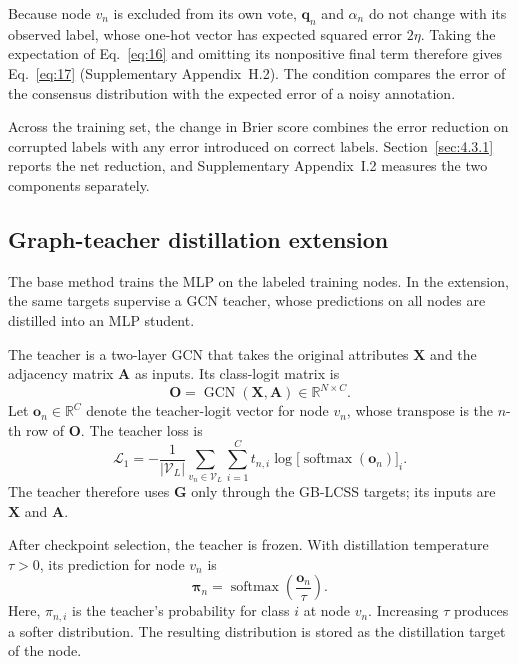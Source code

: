 \documentclass[times,review,10pt]{elsarticle}
\theoremstyle{definition}
\theoremstyle{plain}
\begin{document}
Because node \(v_n\) is excluded from its own vote, \(\mathbf q_n\) and \(\alpha_n\) do not change with its observed label, whose one-hot vector has expected squared error \(2\eta\). Taking the expectation of Eq.~\eqref{eq:16} and omitting its nonpositive final term therefore gives Eq.~\eqref{eq:17} (Supplementary Appendix~H.2). The condition compares the error of the consensus distribution with the expected error of a noisy annotation.

Across the training set, the change in Brier score combines the error reduction on corrupted labels with any error introduced on correct labels. Section~\ref{sec:4.3.1} reports the net reduction, and Supplementary Appendix~I.2 measures the two components separately.

\subsection{Graph-teacher distillation extension}\label{sec:3.5}

The base method trains the MLP on the labeled training nodes. In the extension, the same targets supervise a GCN teacher, whose predictions on all nodes are distilled into an MLP student.

The teacher is a two-layer GCN that takes the original attributes \(\mathbf X\) and the adjacency matrix \(\mathbf A\) as inputs. Its class-logit matrix is
\begin{equation}\label{eq:18}
\mathbf O=\operatorname{GCN}(\mathbf X,\mathbf A)\in\mathbb R^{N\times C}.
\end{equation}
Let \(\mathbf o_n\in\mathbb R^C\) denote the teacher-logit vector for node \(v_n\), whose transpose is the \(n\)-th row of \(\mathbf O\). The teacher loss is
\begin{equation}\label{eq:19}
\mathcal L_1=-\frac{1}{|\mathcal V_L|}\sum_{v_n\in\mathcal V_L}\sum_{i=1}^C t_{n,i}\log\bigl[\operatorname{softmax}(\mathbf o_n)\bigr]_i.
\end{equation}
The teacher therefore uses \(\mathbf G\) only through the GB-LCSS targets; its inputs are \(\mathbf X\) and \(\mathbf A\).

After checkpoint selection, the teacher is frozen. With distillation temperature \(\tau>0\), its prediction for node \(v_n\) is
\begin{equation}\label{eq:20}
\boldsymbol\pi_n=\operatorname{softmax}\left(\frac{\mathbf o_n}{\tau}\right).
\end{equation}
Here, \(\pi_{n,i}\) is the teacher's probability for class \(i\) at node \(v_n\). Increasing \(\tau\) produces a softer distribution. The resulting distribution is stored as the distillation target of the node.
\end{document}
